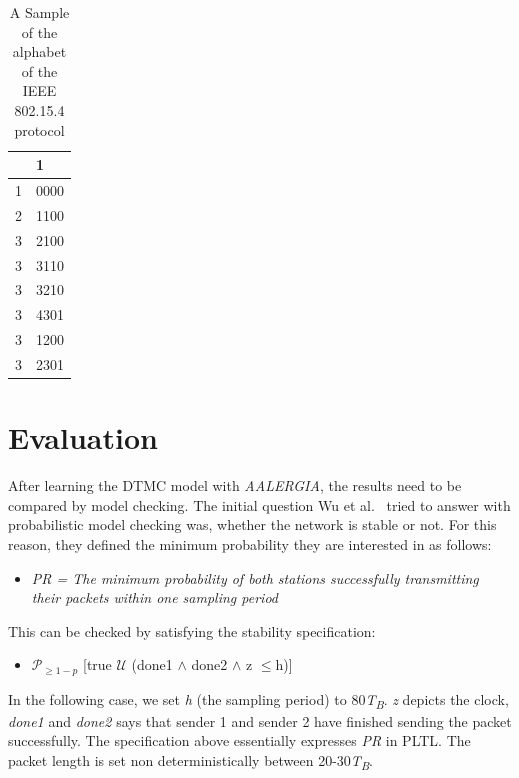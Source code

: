 \documentclass[
a4paper,
12pt
]{scrartcl}
\newcommand{\gray}{\cellcolor{grayself}}  %
\begin{document}
\begin{table}[ht!]
\centering
\begin{tabular}{|l|l|}
\hline
\gray & \gray  1                                 \\ \hline
\gray 1&0000 \\
\hline
\gray 2&1100 \\
\hline
\gray 3&2100 \\
\hline
\gray 3&3110 \\
\hline
\gray 3&3210 \\
\hline
\gray 3&4301 \\
\hline
\gray 3&1200 \\
\hline
\gray 3&2301 \\
\hline
\end{tabular}
\caption{A Sample of the alphabet of the IEEE 802.15.4 protocol}
\label{table:alphmodel}
\end{table}


\section{Evaluation}
After learning the DTMC model with \emph{AALERGIA}, the results need to be compared by model checking. The initial question Wu et al.~\cite{stability} tried to answer with probabilistic model checking was, whether the network is stable or not. For this reason, they defined the minimum probability they are interested in as follows:
\begin{itemize}
  \item \textit{PR = The minimum probability of both stations successfully transmitting their packets within one sampling period}
\end{itemize}

This can be checked by satisfying the stability specification:

\begin{itemize}
  \item $\mathcal{P}_{\geq1-p}$ [true $\mathcal{U}$ (done1 $\land$ done2 $\land$ z $\leq$h)]
\end{itemize}

In the following case, we set \textit{h} (the sampling period) to 80\textit{T\textsubscript{B}}. \textit{z} depicts the clock, \textit{done1} and \textit{done2} says that sender 1 and sender 2 have finished sending the packet successfully. The specification above essentially expresses \textit{PR} in PLTL. The packet length is set non deterministically between 20-30\textit{T\textsubscript{B}}.
\end{document}
